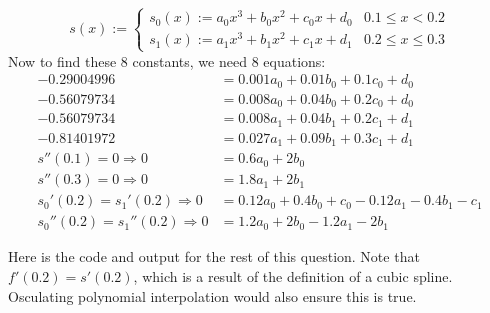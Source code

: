 \documentclass{article}
\begin{document}
\bigskip
\begin{prob}
\end{prob}
\[ s(x) := \begin{cases}
    s_0(x) := a_0 x^3 + b_0 x^2 + c_0 x + d_0 & 0.1 \leq x < 0.2 \\
    s_1(x) := a_1 x^3 + b_1 x^2 + c_1 x + d_1 & 0.2 \leq x \leq 0.3
\end{cases} \]
Now to find these 8 constants, we need 8 equations:
\begin{align*}
    -0.29004996 &= 0.001 a_0 + 0.01 b_0 + 0.1 c_0 + d_0 \\
    -0.56079734 &= 0.008 a_0 + 0.04 b_0 + 0.2 c_0 + d_0 \\
    -0.56079734 &= 0.008 a_1 + 0.04 b_1 + 0.2 c_1 + d_1 \\
    -0.81401972 &= 0.027 a_1 + 0.09 b_1 + 0.3 c_1 + d_1 \\
    s''(0.1)=0 \Rightarrow 0 &=  0.6 a_0 + 2 b_0 \\
    s''(0.3)=0 \Rightarrow 0 &=  1.8 a_1 + 2 b_1 \\
    s_0'(0.2)=s_1'(0.2) \Rightarrow 0 &= 0.12 a_0 + 0.4 b_0 + c_0 - 0.12 a_1 - 0.4 b_1 - c_1 \\
    s_0''(0.2)=s_1''(0.2) \Rightarrow 0 &= 1.2 a_0 + 2 b_0 - 1.2 a_1 - 2 b_1
\end{align*}

Here is the code and output for the rest of this question. Note that $f'(0.2)=s'(0.2)$, which is a result of the definition of a cubic spline. Osculating polynomial interpolation would also ensure this is true.
\end{document}
